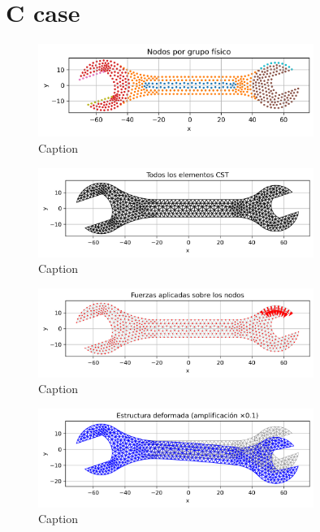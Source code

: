 \documentclass{article}  %
\begin{document}
\section{C case}

\begin{figure}[H]
  \centering
  \includegraphics[width=0.8\textwidth]{GRAFICOS/Case c_nodes_por_grupo.png}
  \caption{Caption}
  \label{fig:wrench}
\end{figure}

\begin{figure}[H]
  \centering
  \includegraphics[width=0.8\textwidth]{GRAFICOS/Case c_elementos.png}
  \caption{Caption}
  \label{fig:deformed_shape}
\end{figure}

\begin{figure}[H]
  \centering
  \includegraphics[width=0.8\textwidth]{GRAFICOS/Case c_fuerzas.png}
  \caption{Caption}
  \label{fig:strain}
\end{figure}

\begin{figure}[H]
  \centering
  \includegraphics[width=0.8\textwidth]{GRAFICOS/Case c_deformada.png}
  \caption{Caption}
  \label{fig:stress}
\end{figure}
\end{document}
